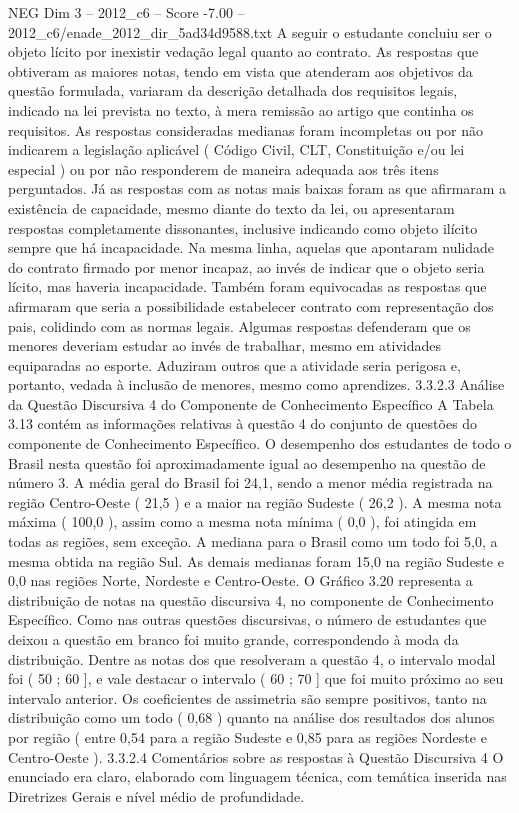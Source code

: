 \begin{textsample}{NEG Dim 3 – 2012\_c6 – Score -7.00 – 2012\_c6/enade\_2012\_dir\_5ad34d9588.txt}
A seguir o estudante concluiu ser o objeto lícito por inexistir vedação legal quanto ao contrato.
As respostas que obtiveram as maiores notas, tendo em vista que atenderam aos objetivos da questão formulada, variaram da descrição detalhada dos requisitos legais, indicado na lei prevista no texto, à mera remissão ao artigo que continha os requisitos.
As respostas consideradas medianas foram incompletas ou por não indicarem a legislação aplicável ( Código Civil, CLT, Constituição e/ou lei especial ) ou por não responderem de maneira adequada aos três itens perguntados.
Já as respostas com as notas mais baixas foram as que afirmaram a existência de capacidade, mesmo diante do texto da lei, ou apresentaram respostas completamente dissonantes, inclusive indicando como objeto ilícito sempre que há incapacidade.
Na mesma linha, aquelas que apontaram nulidade do contrato firmado por menor incapaz, ao invés de indicar que o objeto seria lícito, mas haveria incapacidade.
Também foram equivocadas as respostas que afirmaram que seria a possibilidade estabelecer contrato com representação dos pais, colidindo com as normas legais.
Algumas respostas defenderam que os menores deveriam estudar ao invés de trabalhar, mesmo em atividades equiparadas ao esporte.
Aduziram outros que a atividade seria perigosa e, portanto, vedada à inclusão de menores, mesmo como aprendizes. 3.3.2.3 Análise da Questão Discursiva 4 do Componente de Conhecimento Específico A Tabela 3.13 contém as informações relativas à questão 4 do conjunto de questões do componente de Conhecimento Específico.
O desempenho dos estudantes de todo o Brasil nesta questão foi aproximadamente igual ao desempenho na questão de número 3.
A média geral do Brasil foi 24,1, sendo a menor média registrada na região Centro-Oeste ( 21,5 ) e a maior na região Sudeste ( 26,2 ).
A mesma nota máxima ( 100,0 ), assim como a mesma nota mínima ( 0,0 ), foi atingida em todas as regiões, sem exceção.
A mediana para o Brasil como um todo foi 5,0, a mesma obtida na região Sul.
As demais medianas foram 15,0 na região Sudeste e 0,0 nas regiões Norte, Nordeste e Centro-Oeste.
O Gráfico 3.20 representa a distribuição de notas na questão discursiva 4, no componente de Conhecimento Específico.
Como nas outras questões discursivas, o número de estudantes que deixou a questão em branco foi muito grande, correspondendo à moda da distribuição.
Dentre as notas dos que resolveram a questão 4, o intervalo modal foi ( 50 ; 60 ], e vale destacar o intervalo ( 60 ; 70 ] que foi muito próximo ao seu intervalo anterior.
Os coeficientes de assimetria são sempre positivos, tanto na distribuição como um todo ( 0,68 ) quanto na análise dos resultados dos alunos por região ( entre 0,54 para a região Sudeste e 0,85 para as regiões Nordeste e Centro-Oeste ). 3.3.2.4 Comentários sobre as respostas à Questão Discursiva 4 O enunciado era claro, elaborado com linguagem técnica, com temática inserida nas Diretrizes Gerais e nível médio de profundidade.

\end{textsample}
